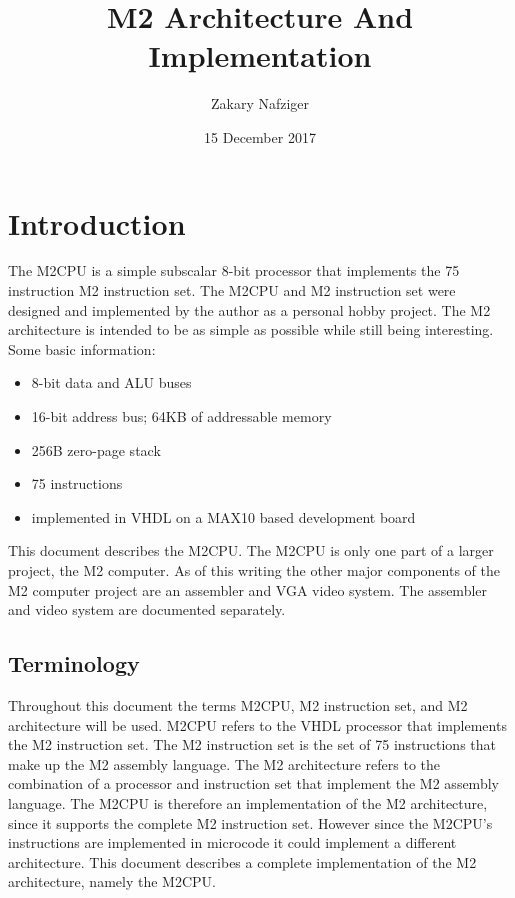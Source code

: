 \documentclass[a4paper,12pt]{article}
\title{M2 Architecture And Implementation}
\author{Zakary Nafziger}
\date{15 December 2017}
\newcommand{\mt}{M2CPU}
\newcommand{\mi}{M2 instruction set}
\newcommand{\ma}{M2 architecture}
\newcommand{\inum}{75}
\begin{document}
\maketitle
{}
\newpage

\tableofcontents
{}
\newpage

\listoftables
\listoffigures
\newpage


\section{Introduction}
The \mt{} is a simple subscalar 8-bit processor that implements the \inum{} 
instruction \mi{}. The \mt{} and \mi{} were designed and implemented by the author
as a personal hobby project. The \ma{} is intended to be as simple as possible 
while still being interesting. Some basic information: 
\par

\begin{itemize}
\item 8-bit data and ALU buses
\item 16-bit address bus; 64KB of addressable memory
\item 256B zero-page stack
\item \inum{} instructions
\item implemented in VHDL on a MAX10 based development board
\end{itemize}

This document describes the \mt{}. The \mt{} is only one part of a larger 
project, the M2 computer. As of this writing the other major components of the
M2 computer project are an assembler and VGA video system. The assembler and 
video system are documented separately. 
\par

\subsection{Terminology}
Throughout this document the terms \mt{}, \mi{}, and \ma{} will be used. \mt{} 
refers to the VHDL processor that implements the \mi{}. The \mi{} is the set of
\inum{} instructions that make up the M2 assembly language. The \ma{} refers to the
combination of a processor and instruction set that implement the M2 assembly 
language. The \mt{} is therefore an implementation of the \ma{}, since it 
supports the complete \mi{}. However since the \mt{}'s instructions are 
implemented in microcode it could implement a different architecture. This 
document describes a complete implementation of the \ma{}, namely the \mt{}.
\par
\end{document}
